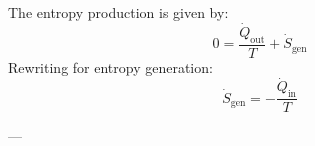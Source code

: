 The entropy production is given by:  
\[
0 = \frac{\dot{Q}_{\text{out}}}{T} + \dot{S}_{\text{gen}}
\]  
Rewriting for entropy generation:  
\[
\dot{S}_{\text{gen}} = -\frac{\dot{Q}_{\text{in}}}{T}
\]  

---
